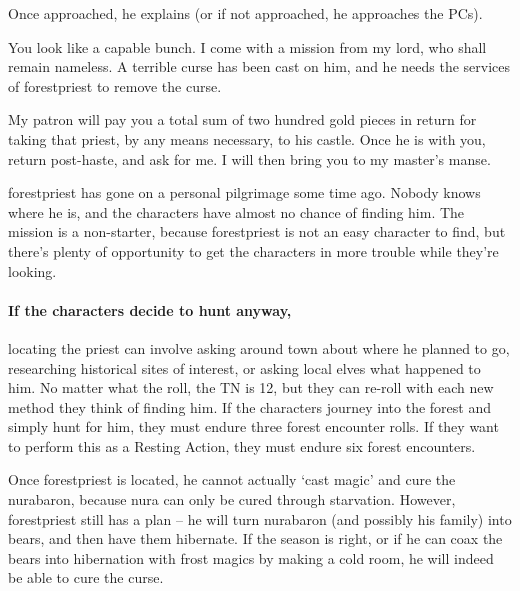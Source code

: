 \begin{multicols}{2}
\begin{boxtext}
\end{boxtext}

Once approached, he explains (or if not approached, he approaches the PCs).

\begin{speechtext}

	You look like a capable bunch.
	I come with a mission from my lord, who shall remain nameless.
	A terrible curse has been cast on him, and he needs the services of \gls{forestpriest} to remove the curse.

	My patron will pay you a total sum of two hundred gold pieces in return for taking that priest, by any means necessary, to his castle.
	Once he is with you, return post-haste, and ask for me.
	I will then bring you to my master's manse.

\end{speechtext}

\Gls{forestpriest} has gone on a personal pilgrimage some time ago.
Nobody knows where he is, and the characters have almost no chance of finding him.
The mission is a non-starter, because \gls{forestpriest} is not an easy character to find, but there's plenty of opportunity to get the characters in more trouble while they're looking.

\paragraph{If the characters decide to hunt anyway,}
locating the priest can involve asking around town about where he planned to go, researching historical sites of interest, or asking local elves what happened to him.
No matter what the roll, the TN is 12, but they can re-roll with each new method they think of finding him.
If the characters journey into the forest and simply hunt for him, they must endure three forest encounter rolls.
If they want to perform this as a Resting Action, they must endure six forest encounters.

Once \gls{forestpriest} is located, he cannot actually `cast magic' and cure the \gls{nurabaron}, because nura can only be cured through starvation.
However, \gls{forestpriest} still has a plan -- he will turn \gls{nurabaron} (and possibly his family) into bears, and then have them hibernate.
If the season is right, or if he can coax the bears into hibernation with frost magics by making a cold room, he will indeed be able to cure the curse.



\end{multicols}
